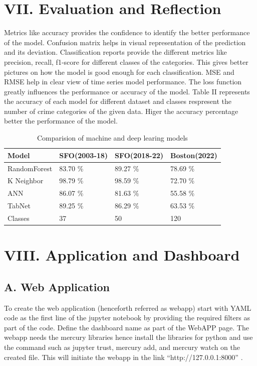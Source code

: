 \documentclass[11 pt,conference,final,]{IEEEtran}
\begin{document}
\section{VII. Evaluation and
Reflection}\label{vii.-evaluation-and-reflection}

Metrics like accuracy provides the confidence to identify the better
performance of the model. Confusion matrix helps in visual
representation of the prediction and its deviation. Classification
reports provide the different metrics like precision, recall, f1-score
for different classes of the categories. This gives better pictures on
how the model is good enough for each classification. MSE and RMSE help
in clear view of time series model performance. The loss function
greatly influences the performance or accuracy of the model. Table II
represents the accuracy of each model for different dataset and classes
respresent the number of crime categories of the given data. Higer the
accuracy percentage better the performance of the model.

\begin{table}
\centering
\caption{\label{tab:unnamed-chunk-17}Comparision of machine and deep learing models}
\centering
\begin{tabular}[t]{l|l|l|l}
\hline
Model & SFO(2003-18) & SFO(2018-22) & Boston(2022)\\
\hline
RandomForest & 83.70 \% & 89.27 \% & 78.69 \%\\
\hline
K Neighbor & 98.79 \% & 98.59 \% & 72.70 \%\\
\hline
ANN & 86.07 \% & 81.63 \% & 55.58 \%\\
\hline
TabNet & 89.25 \% & 86.29 \% & 63.53 \%\\
\hline
Classes & 37 & 50 & 120\\
\hline
\end{tabular}
\end{table}

\section{VIII. Application and
Dashboard}\label{viii.-application-and-dashboard}

\subsection{A. Web Application}\label{a.-web-application}

To create the web application (henceforth referred as webapp) start with
YAML code as the first line of the jupyter notebook by providing the
required filters as part of the code. Define the dashboard name as part
of the WebAPP page. The webapp needs the mercury libraries hence install
the libraries for python and use the command such as jupyter trust,
mercury add, and mercury watch on the created file. This will initiate
the webapp in the link ``http://127.0.0.1:8000'' .
\end{document}

